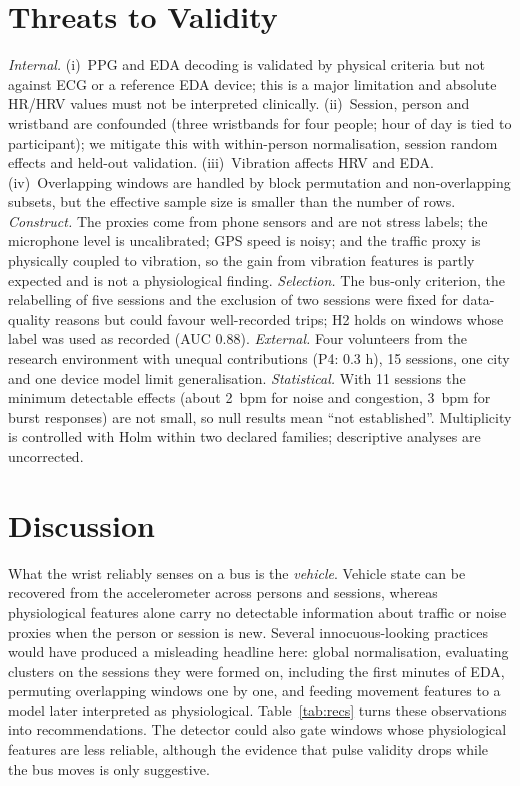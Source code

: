 \documentclass[runningheads]{llncs}
\begin{document}
\section{Threats to Validity}
\label{sec:threats}
\emph{Internal.} (i)~PPG and EDA decoding is validated by physical criteria but not against ECG or a reference EDA device; this is a major limitation and absolute HR/HRV values must not be interpreted clinically. (ii)~Session, person and wristband are confounded (three wristbands for four people; hour of day is tied to participant); we mitigate this with within-person normalisation, session random effects and held-out validation. (iii)~Vibration affects HRV and EDA. (iv)~Overlapping windows are handled by block permutation and non-overlapping subsets, but the effective sample size is smaller than the number of rows.
\emph{Construct.} The proxies come from phone sensors and are not stress labels; the microphone level is uncalibrated; GPS speed is noisy; and the traffic proxy is physically coupled to vibration, so the gain from vibration features is partly expected and is not a physiological finding.
\emph{Selection.} The bus-only criterion, the relabelling of five sessions and the exclusion of two sessions were fixed for data-quality reasons but could favour well-recorded trips; H2 holds on windows whose label was used as recorded (AUC 0.88).
\emph{External.} Four volunteers from the research environment with unequal contributions (P4: 0.3 h), 15 sessions, one city and one device model limit generalisation.
\emph{Statistical.} With 11 sessions the minimum detectable effects (about 2~bpm for noise and congestion, 3~bpm for burst responses) are not small, so null results mean ``not established''. Multiplicity is controlled with Holm within two declared families; descriptive analyses are uncorrected.

\section{Discussion}
What the wrist reliably senses on a bus is the \emph{vehicle}. Vehicle state can be recovered from the accelerometer across persons and sessions, whereas physiological features alone carry no detectable information about traffic or noise proxies when the person or session is new. Several innocuous-looking practices would have produced a misleading headline here: global normalisation, evaluating clusters on the sessions they were formed on, including the first minutes of EDA, permuting overlapping windows one by one, and feeding movement features to a model later interpreted as physiological. Table~\ref{tab:recs} turns these observations into recommendations. The detector could also gate windows whose physiological features are less reliable, although the evidence that pulse validity drops while the bus moves is only suggestive.
\end{document}
